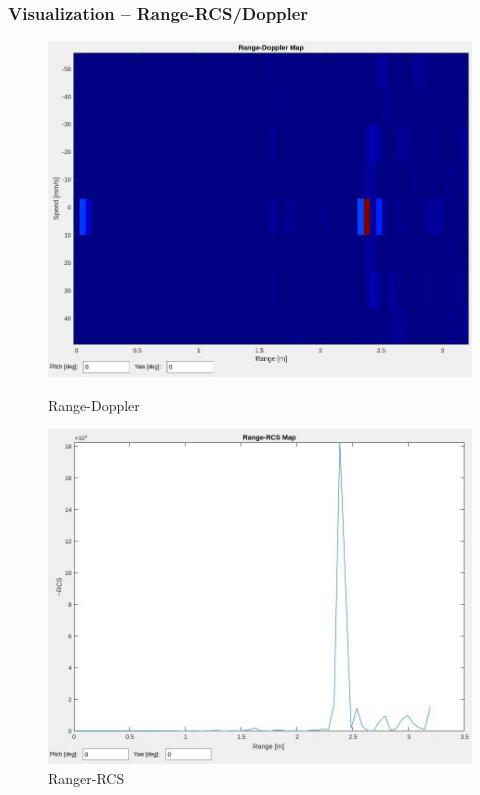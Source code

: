 \documentclass[aspectratio=43]{beamer}
\begin{document}
\begin{frame}[fragile]
  \frametitle{Visualization -- Range-RCS/Doppler}
  \begin{figure}[!htb]
    \begin{minipage}{0.48\textwidth}
      \centering
      \includegraphics[width=\textwidth]{../img/vis_range_dop.jpg}
      \caption{Range-Doppler}
    \end{minipage}\hfill
    \begin{minipage}{0.48\textwidth}
      \centering
      \includegraphics[width=\textwidth]{../img/vis_range_rcs.jpg}
      \caption{Ranger-RCS}
    \end{minipage}
  \end{figure}
\end{frame}
\end{document}
